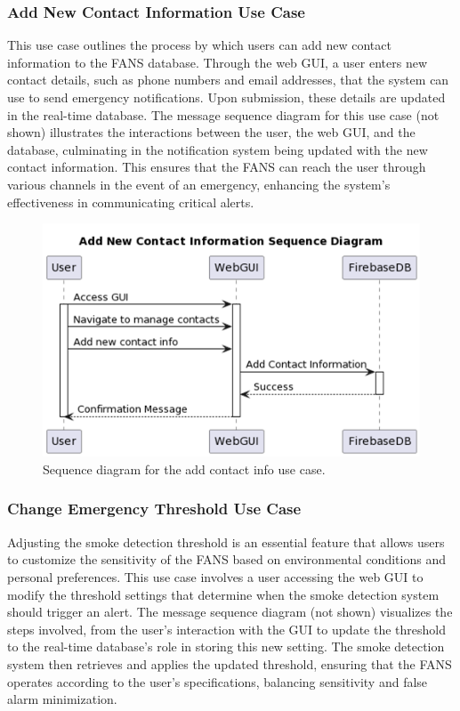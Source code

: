 \subsubsection{Add New Contact Information Use Case}

This use case outlines the process by which users can add new contact information to the FANS database. Through the web
GUI, a user enters new contact details, such as phone numbers and email addresses, that the system can use to send
emergency notifications. Upon submission, these details are updated in the real-time database. The message sequence
diagram for this use case (not shown) illustrates the interactions between the user, the web GUI, and the database,
culminating in the notification system being updated with the new contact information. This ensures that the FANS can
reach the user through various channels in the event of an emergency, enhancing the system's effectiveness in
communicating critical alerts.

\begin{figure}[H]
    \centering
    \includegraphics[width=\linewidth]{../assets/NewContact.png}
    \caption{Sequence diagram for the add contact info use case.}
\end{figure}

\subsubsection{Change Emergency Threshold Use Case}

Adjusting the smoke detection threshold is an essential feature that allows users to customize the sensitivity of the
FANS based on environmental conditions and personal preferences. This use case involves a user accessing the web GUI to
modify the threshold settings that determine when the smoke detection system should trigger an alert. The message
sequence diagram (not shown) visualizes the steps involved, from the user's interaction with the GUI to update the
threshold to the real-time database's role in storing this new setting. The smoke detection system then retrieves and
applies the updated threshold, ensuring that the FANS operates according to the user's specifications, balancing
sensitivity and false alarm minimization.

